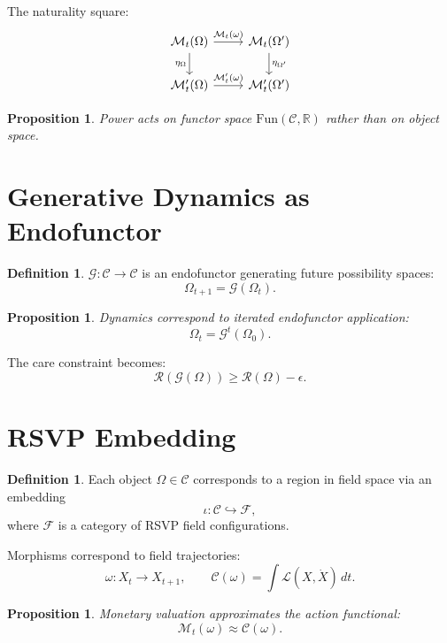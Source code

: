 \documentclass[11pt,a4paper]{article}
\newtheorem{proposition}[theorem]{Proposition}
\theoremstyle{definition}
\newtheorem{definition}[theorem]{Definition}
\theoremstyle{remark}
\begin{document}
The naturality square:
\[
\begin{tikzcd}
\mathcal{M}_t(\Omega) \arrow[r, "\mathcal{M}_t(\omega)"] \arrow[d, "\eta_\Omega"'] & \mathcal{M}_t(\Omega') \arrow[d, "\eta_{\Omega'}"] \\
\mathcal{M}'_t(\Omega) \arrow[r, "\mathcal{M}'_t(\omega)"] & \mathcal{M}'_t(\Omega')
\end{tikzcd}
\]

\begin{proposition}
Power acts on functor space $\mathrm{Fun}(\mathcal{C}, \mathbb{R})$ rather than on object space.
\end{proposition}

\section{Generative Dynamics as Endofunctor}

\begin{definition}
$\mathcal{G} : \mathcal{C} \to \mathcal{C}$ is an endofunctor generating future possibility spaces:
\[
\Omega_{t+1} = \mathcal{G}(\Omega_t).
\]
\end{definition}

\begin{proposition}
Dynamics correspond to iterated endofunctor application:
\[
\Omega_t = \mathcal{G}^t(\Omega_0).
\]
\end{proposition}

The care constraint becomes:
\[
\mathcal{R}(\mathcal{G}(\Omega)) \geq \mathcal{R}(\Omega) - \epsilon.
\]

\section{RSVP Embedding}

\begin{definition}
Each object $\Omega \in \mathcal{C}$ corresponds to a region in field space via an embedding
\[
\iota : \mathcal{C} \hookrightarrow \mathcal{F},
\]
where $\mathcal{F}$ is a category of RSVP field configurations.
\end{definition}

Morphisms correspond to field trajectories:
\[
\omega : X_t \to X_{t+1}, \qquad \mathcal{C}(\omega) = \int \mathcal{L}(X, \dot{X})\, dt.
\]

\begin{proposition}
Monetary valuation approximates the action functional:
\[
\mathcal{M}_t(\omega) \approx \mathcal{C}(\omega).
\]
\end{proposition}
\end{document}
